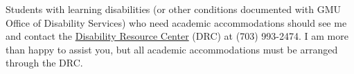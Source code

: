 \documentclass[11pt]{article}
\begin{document}
Students with learning disabilities (or other conditions documented with GMU Office of Disability Services) who need academic accommodations should see me and contact the \href{http://ods.gmu.edu/}{Disability Resource Center} (DRC) at (703) 993-2474. I am more than happy to assist you, but all academic accommodations must be arranged through the DRC.



\end{document}
